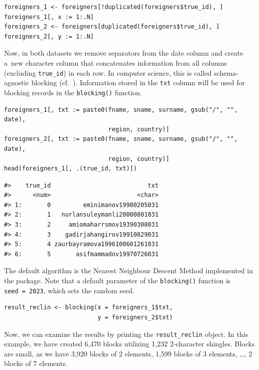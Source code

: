 \begin{verbatim}
foreigners_1 <- foreigners[!duplicated(foreigners$true_id), ]
foreigners_1[, x := 1:.N]
foreigners_2 <- foreigners[duplicated(foreigners$true_id), ]
foreigners_2[, y := 1:.N]
\end{verbatim}

Now, in both datasets we remove separators from the date column and
create a~new character column that concatenates information from all
columns (excluding \texttt{true\_id}) in each row. In computer science, this is called schema-agnostic blocking (cf.~\citet{papadakis2016schema}). Information stored in the
\texttt{txt} column will be used for blocking records in the \texttt{blocking()}
function.

\begin{verbatim}
foreigners_1[, txt := paste0(fname, sname, surname, gsub("/", "", date), 
                             region, country)]
foreigners_2[, txt := paste0(fname, sname, surname, gsub("/", "", date), 
                             region, country)]
head(foreigners_1[, .(true_id, txt)])
\end{verbatim}

\begin{verbatim}
#>    true_id                           txt
#>      <num>                        <char>
#> 1:       0         eminimanov19980205031
#> 2:       1   nurlansuleymanli20000801031
#> 3:       2     amiomaharrsmov19390308031
#> 4:       3    gadirjahangirov19910829031
#> 5:       4 zaurbayramova1996100601261031
#> 6:       5       asifmammadov19970726031
\end{verbatim}

The default algorithm is the Nearest Neighbour Descent Method
\citep{Dong2011} implemented in the  package. Note that a
default parameter of the \texttt{blocking()} function is \texttt{seed\ =\ 2023}, which
sets the random seed.

\begin{verbatim}
result_reclin <- blocking(x = foreigners_1$txt,
                          y = foreigners_2$txt)
\end{verbatim}

Now, we can examine the results by printing the \texttt{result\_reclin} object.
In this example, we have created
6,470
blocks utilizing
1,232 2-character
shingles. Blocks are small, as we have
3,920 blocks of 2
elements, 1,599 blocks of
3 elements, \ldots,
2 blocks of
7 elements.


